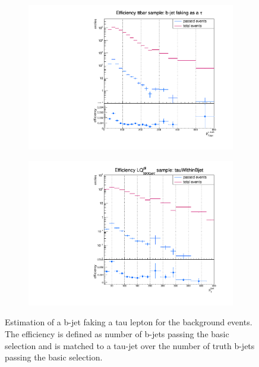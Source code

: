 \begin{figure}
  \centering
                \begin{subfigure}[t]{0.49\textwidth}
                \includegraphics[width=\textwidth]{figures/plots/ttbar/Divided_Bjet.pdf}
                \label{DividedBjet:bg:ttbar}
                \end{subfigure}
                \begin{subfigure}[t]{0.49\textwidth}
                \includegraphics[width=\textwidth]{figures/plots/ttH/Divided_Bjet.pdf}
                \label{DividedBjet:bg:ttH}
                \end{subfigure}
\caption[Estimation of a b-jet faking a tau lepton for the background events.]{Estimation of a b-jet faking a tau lepton for the background events. The efficiency is defined as number of b-jets passing the basic selection and is matched to a tau-jet over the number of truth b-jets passing the basic selection.}
\label{DividedBjet:bg}
\end{figure}

